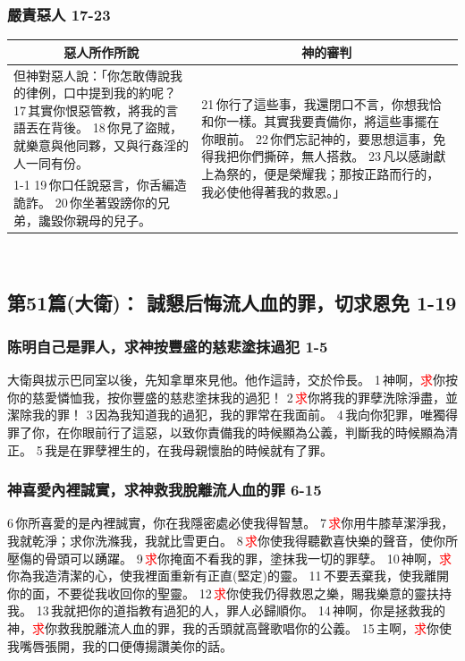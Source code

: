 \subsubsection{嚴責惡人 17-23}
\begin{table}[H]
\centering
\begin{tabular}{p{8.75cm}|p{8.00cm}}\hline\hline
\multicolumn{1}{c|}{惡人所作所說}&\multicolumn{1}{c}{神的審判}\\\hline
但神對惡人說：「你怎敢傳說我的律例，口中提到我的約呢？
17 其實你恨惡管教，將我的言語丟在背後。
18 你見了盜賊，就樂意與他同夥，又與行姦淫的人一同有份。
&\multirow{2}{8.1cm}{21 你行了這些事，我還閉口不言，你想我恰和你一樣。其實我要責備你，將這些事擺在你眼前。
22 你們忘記神的，要思想這事，免得我把你們撕碎，無人搭救。
23 凡以感謝獻上為祭的，便是榮耀我；那按正路而行的，我必使他得著我的救恩。」}\\\cline{1-1}
19 你口任說惡言，你舌編造詭詐。
20 你坐著毀謗你的兄弟，讒毀你親母的兒子。&\\\hline
\end{tabular}
\end{table} 

\subsection{第51篇(大衛)： 誠懇后悔流人血的罪，切求恩免 1-19}
\subsubsection{陈明自己是罪人，求神按豐盛的慈悲塗抹過犯 1-5}
大衛與拔示巴同室以後，先知拿單來見他。他作這詩，交於伶長。
1 神啊，\textcolor{red}{求}你按你的慈愛憐恤我，按你豐盛的慈悲塗抹我的過犯！
2 \textcolor{red}{求}你將我的罪孽洗除淨盡，並潔除我的罪！
3 因為我知道我的過犯，我的罪常在我面前。
4 我向你犯罪，唯獨得罪了你，在你眼前行了這惡，以致你責備我的時候顯為公義，判斷我的時候顯為清正。
5 我是在罪孽裡生的，在我母親懷胎的時候就有了罪。

\subsubsection{神喜愛內裡誠實，求神救我脫離流人血的罪 6-15}
6 你所喜愛的是內裡誠實，你在我隱密處必使我得智慧。
7 \textcolor{red}{求}你用牛膝草潔淨我，我就乾淨；求你洗滌我，我就比雪更白。
8 \textcolor{red}{求}你使我得聽歡喜快樂的聲音，使你所壓傷的骨頭可以踴躍。
9 \textcolor{red}{求}你掩面不看我的罪，塗抹我一切的罪孽。
10 神啊，\textcolor{red}{求}你為我造清潔的心，使我裡面重新有正直(堅定)的靈。
11 不要丟棄我，使我離開你的面，不要從我收回你的聖靈。
12 \textcolor{red}{求}你使我仍得救恩之樂，賜我樂意的靈扶持我。
13 我就把你的道指教有過犯的人，罪人必歸順你。
14 神啊，你是拯救我的神，\textcolor{red}{求}你救我脫離流人血的罪，我的舌頭就高聲歌唱你的公義。
15 主啊，\textcolor{red}{求}你使我嘴唇張開，我的口便傳揚讚美你的話。

